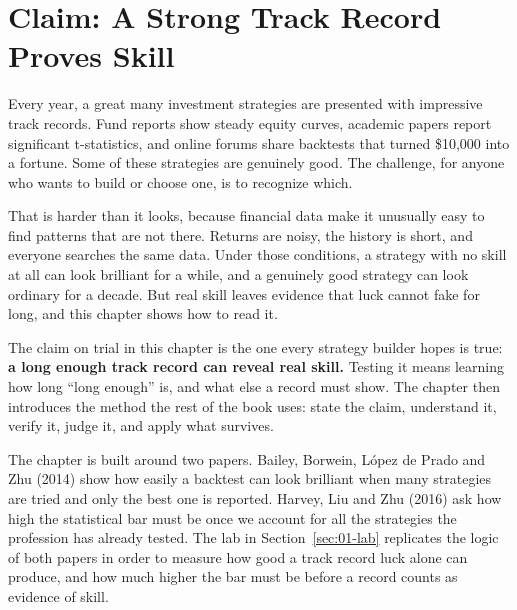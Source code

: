 \makeatletter
{}
\makeatother

\chapter{Claim: A Strong Track Record Proves Skill}
\label{ch:01}

Every year, a great many investment strategies are presented with impressive track records. Fund reports show steady equity curves, academic papers report significant t-statistics, and online forums share backtests that turned \$10,000 into a fortune. Some of these strategies are genuinely good. The challenge, for anyone who wants to build or choose one, is to recognize which.

That is harder than it looks, because financial data make it unusually easy to find patterns that are not there. Returns are noisy, the history is short, and everyone searches the same data. Under those conditions, a strategy with no skill at all can look brilliant for a while, and a genuinely good strategy can look ordinary for a decade. But real skill leaves evidence that luck cannot fake for long, and this chapter shows how to read it.

The claim on trial in this chapter is the one every strategy builder hopes is true: \textbf{a long enough track record can reveal real skill.} Testing it means learning how long ``long enough'' is, and what else a record must show. The chapter then introduces the method the rest of the book uses: state the claim, understand it, verify it, judge it, and apply what survives.

The chapter is built around two papers. Bailey, Borwein, L\'opez de Prado and Zhu (2014) show how easily a backtest can look brilliant when many strategies are tried and only the best one is reported. Harvey, Liu and Zhu (2016) ask how high the statistical bar must be once we account for all the strategies the profession has already tested. The lab in Section~\ref{sec:01-lab} replicates the logic of both papers in order to measure how good a track record luck alone can produce, and how much higher the bar must be before a record counts as evidence of skill.

